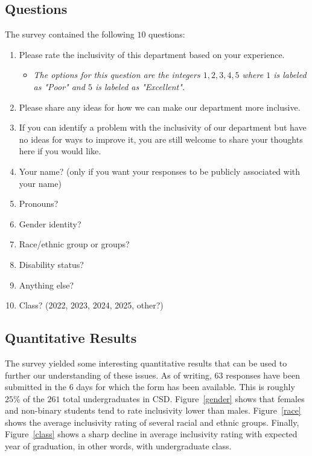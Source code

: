 \documentclass{article}
\begin{document}
\subsection{Questions}
The survey contained the following $10$ questions:
\begin{enumerate}
\item Please rate the inclusivity of this department based on your experience.	
\begin{itemize}
\item
\emph{The options for this question are the integers $1,2,3,4,5$ 
where $1$ is labeled as "Poor" and $5$ is labeled as "Excellent".}
\end{itemize}
\item Please share any ideas for how we can make our department more inclusive.	
\item If you can identify a problem with the inclusivity of our department but have no ideas for ways to improve it, you are still welcome to share your thoughts here if you would like.	
\item Your name? (only if you want your responses to be publicly associated with your name)	
\item Pronouns?	
\item Gender identity?	
\item Race/ethnic group or groups?	
\item Disability status?	
\item Anything else?	
\item Class? (2022, 2023, 2024, 2025, other?)
\end{enumerate}

\subsection{Quantitative Results}
The survey yielded some interesting quantitative results that can be 
used to further our understanding of these issues.
As of writing, $63$ responses have been submitted in the $6$ days for which the form
has been available.
This is roughly $25\%$ of the $261$ total undergraduates in CSD.
Figure~\ref{gender} shows that females and non-binary students tend to rate inclusivity lower than males.
Figure~\ref{race} shows the average inclusivity rating of several racial 
and ethnic groups.
Finally, Figure~\ref{class} shows a sharp decline in average inclusivity rating with 
expected year of graduation, in other words, with undergraduate class.
\end{document}

